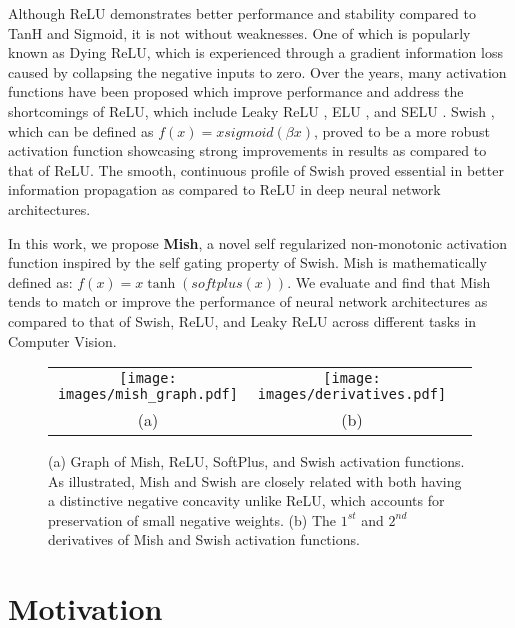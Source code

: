\documentclass{bmvc2k}
\begin{document}
Although ReLU demonstrates better performance and stability compared to TanH and Sigmoid, it is not without weaknesses. One of which is popularly known as Dying ReLU, which is experienced through a gradient information loss caused by collapsing the negative inputs to zero. Over the years, many activation functions have been proposed which improve performance and address the shortcomings of ReLU, which include Leaky ReLU \cite{maas2013rectifier}, ELU \cite{clevert2015fast}, and SELU \cite{klambauer2017self}. Swish \cite{ramachandran2017searching}, which can be defined as $f(x)=xsigmoid(\beta x)$, proved to be a more robust activation function showcasing strong improvements in results as compared to that of ReLU. The smooth, continuous profile of Swish proved essential in better information propagation as compared to ReLU in deep neural network architectures. 

In this work, we propose \textbf{Mish}, a novel self regularized non-monotonic activation function inspired by the self gating property of Swish. Mish is mathematically defined as: $f(x)=x\tanh(softplus(x))$. We evaluate and find that Mish tends to match or improve the performance of neural network architectures as compared to that of Swish, ReLU, and Leaky ReLU across different tasks in Computer Vision.

\begin{figure}
	\centering
	\begin{tabular}{ccc}
	\texttt{[image: images/mish\_graph.pdf]}&
	\texttt{[image: images/derivatives.pdf]}\\
	(a)&(b)
	\end{tabular}
\caption{(a) Graph of Mish, ReLU, SoftPlus, and Swish activation functions. As illustrated, Mish and Swish are closely related with both having a distinctive negative concavity unlike ReLU, which accounts for preservation of small negative weights. (b) The ${1}^{st}$ and ${2}^{nd}$ derivatives of Mish and Swish activation functions.}
\label{fig:Mish}
\end{figure}

\section{Motivation}
\label{sec:motivation}
\end{document}
